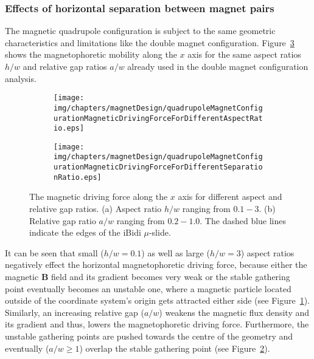 \subsubsection{Effects of horizontal separation between magnet pairs}\label{subsubsec:EffectsOfHorizontalSeparatinBetweenMagnetPairs}
The magnetic quadrupole configuration is subject to the same geometric characteristics and limitations like the double magnet configuration. Figure~\ref{fig:quadrupoleMagnetConfigurationMagneticDrivingForceForDifferentRatio} shows the magnetophoretic mobility along the $x$ axis for the same aspect ratios $h/w$ and relative gap ratios $a/w$ already used in the double magnet configuration analysis. 

\begin{figure}[!htb]
\centering
	\begin{subfigure}[b]{0.48\textwidth}
		\texttt{[image: img/chapters/magnetDesign/quadrupoleMagnetConfigurationMagneticDrivingForceForDifferentAspectRatio.eps]}
	\caption{}
    \label{fig:quadrupoleMagnetConfigurationMagneticDrivingFroceAspectRatio}
    \end{subfigure}
    \hfill
	\begin{subfigure}[b]{0.48\textwidth}
		\texttt{[image: img/chapters/magnetDesign/quadrupoleMagnetConfigurationMagneticDrivingForceForDifferentSeparationRatio.eps]}
	\caption{}
	\label{fig:quadrupoleMagnetConfigurationMagneticDrivingFroceSeparationRatio} %
	\end{subfigure}
\caption[Magnetic driving force of the quadrupole magnet configuration for different aspect and relative gap ratios]{The magnetic driving force along the $x$ axis for different aspect and relative gap ratios. (a) Aspect ratio $h/w$ ranging from $0.1-3$. (b) Relative gap ratio $a/w$ ranging from $0.2-1.0$. The dashed blue lines indicate the edges of the iBidi $\mu$-slide.}%
\label{fig:quadrupoleMagnetConfigurationMagneticDrivingForceForDifferentRatio}
\end{figure}

It can be seen that small ($h/w=0.1$) as well as large ($h/w=3$) aspect ratios negatively effect the horizontal magnetophoretic driving force, because either the magnetic $\mathbf{B}$ field and its gradient becomes very weak or the stable gathering point eventually becomes an unstable one, where a magnetic particle located outside of the coordinate system's origin gets attracted either side (see Figure~\ref{fig:quadrupoleMagnetConfigurationMagneticDrivingFroceAspectRatio}). Similarly, an increasing relative gap ($a/w$) weakens the magnetic flux density and its gradient and thus, lowers the magnetophoretic driving force. Furthermore, the unstable gathering points are pushed towards the centre of the geometry and eventually ($a/w \geq 1$) overlap the stable gathering point (see Figure~\ref{fig:quadrupoleMagnetConfigurationMagneticDrivingFroceSeparationRatio}).


